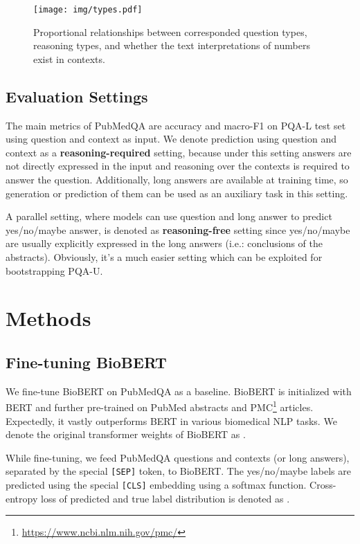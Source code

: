 \documentclass[11pt,a4paper]{article}
\begin{document}
\begin{figure}
    \centering
    \texttt{[image: img/types.pdf]}
    \vskip -0.15cm
    \caption{Proportional relationships between corresponded question types, reasoning types, and whether the text interpretations of numbers exist in contexts.}
    \label{fig:type}
\end{figure}

\subsection{Evaluation Settings}
The main metrics of PubMedQA are accuracy and macro-F1 on PQA-L test set using question and context as input. We denote prediction using question and context as a \textbf{reasoning-required} setting, because under this setting answers are not directly expressed in the input and reasoning over the contexts is required to answer the question. Additionally, long answers are available at training time, so generation or prediction of them can be used as an auxiliary task in this setting.

A parallel setting, where models can use question and long answer to predict yes/no/maybe answer, is denoted as \textbf{reasoning-free} setting since yes/no/maybe are usually explicitly expressed in the long answers (i.e.: conclusions of the abstracts). Obviously, it's a much easier setting which can be exploited for bootstrapping PQA-U.

\section{Methods}

\subsection{Fine-tuning BioBERT}
We fine-tune BioBERT \cite{lee2019biobert} on PubMedQA as a baseline. BioBERT is initialized with BERT \cite{devlin2018bert} and further pre-trained on PubMed abstracts and PMC\footnote{\url{https://www.ncbi.nlm.nih.gov/pmc/}} articles. Expectedly, it vastly outperforms BERT in various biomedical NLP tasks. We denote the original transformer weights of BioBERT as .

While fine-tuning, we feed PubMedQA questions and contexts (or long answers), separated by the special {\tt [SEP]} token, to BioBERT. The yes/no/maybe labels are predicted using the special {\tt [CLS]} embedding using a softmax function. Cross-entropy loss of predicted and true label distribution is denoted as .
\end{document}
